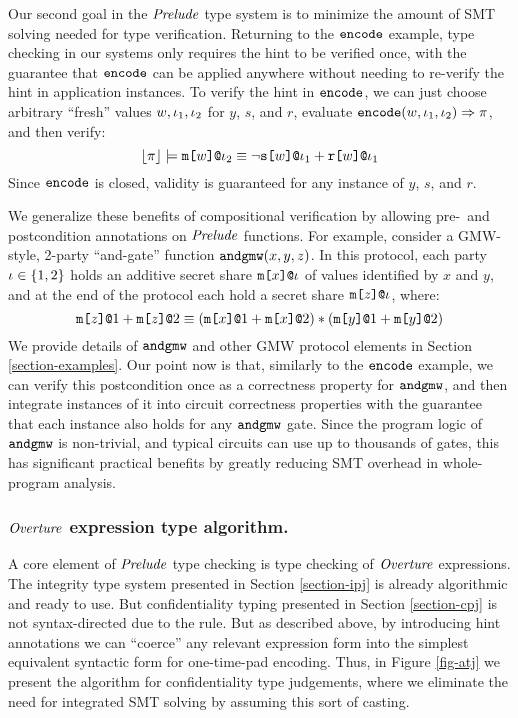 Our second goal in the $\mathit{Prelude}$ type system is to minimize the
amount of SMT solving needed for type verification.  Returning to the
$\texttt{encode}$ example, type checking in our systems only requires the
hint to be verified once, with the guarantee that $\texttt{encode}$ can
be applied anywhere without needing to re-verify the hint in
application instances. To verify the hint in $\texttt{encode}$, we can
just choose arbitrary ``fresh'' values $w,\iota_1,\iota_2$ for $y$, $s$,
and $r$, evaluate $\texttt{encode}(w,\iota_1,\iota_2) \Rightarrow \pi$, and
then verify:
$$\lfloor \pi \rfloor \models \texttt{m[}w\texttt{]}\texttt{@}\iota_2 \equiv
\neg\texttt{s[}w\texttt{]}\texttt{@}\iota_1 + \texttt{r[}w\texttt{]}\texttt{@}\iota_1$$ 
Since $\texttt{encode}$ is closed, validity is guaranteed for
any instance of $y$, $s$, and $r$.

We generalize these benefits of compositional verification by allowing
pre-~and postcondition annotations on $\mathit{Prelude}$ functions. For
example, consider a GMW-style, 2-party ``and-gate'' function
$\texttt{andgmw}(x,y,z)$. In this protocol, each party $\iota
\in \{1,2\}$ holds an additive secret share $\texttt{m[}x\texttt{]}\texttt{@}\iota$ of
values identified by $x$ and $y$, and at the end of the
protocol each hold a secret share $\texttt{m[}z\texttt{]}\texttt{@}\iota$, where:
$$
\texttt{m[}z\texttt{]}\texttt{@}1 + \texttt{m[}z\texttt{]}\texttt{@}2 \equiv (\texttt{m[}x\texttt{]}\texttt{@}1 + \texttt{m[}x\texttt{]}\texttt{@}2) * (\texttt{m[}y\texttt{]}\texttt{@}1 + \texttt{m[}y\texttt{]}\texttt{@}2)
$$
We provide details of $\texttt{andgmw}$ and other GMW protocol
elements in Section \ref{section-examples}.  Our point now is that,
similarly to the $\texttt{encode}$ example, we can verify this
postcondition once as a correctness property for $\texttt{andgmw}$, and
then integrate instances of it into circuit correctness properties
with the guarantee that each instance also holds for any
$\texttt{andgmw}$ gate.  Since the program logic of $\texttt{andgmw}$ is
non-trivial, and typical circuits can use up to thousands of gates,
this has significant practical benefits by greatly reducing SMT overhead
in whole-program analysis.

\atjfig

\subsubsection{$\mathit{Overture}$ expression type algorithm.}

A core element of $\mathit{Prelude}$ type checking is type checking
of $\mathit{Overture}$ expressions. The integrity type system presented in Section
\ref{section-ipj} is already algorithmic and ready to use. But confidentiality
typing presented in Section \ref{section-cpj} is not syntax-directed
due to the  rule. But as described above, by introducing
hint annotations we can ``coerce'' any relevant expression form into
the simplest equivalent syntactic form for one-time-pad encoding.
Thus, in Figure \ref{fig-atj} we present the algorithm for
confidentiality type judgements, where we eliminate the need for
integrated SMT solving by assuming this sort of casting. 

